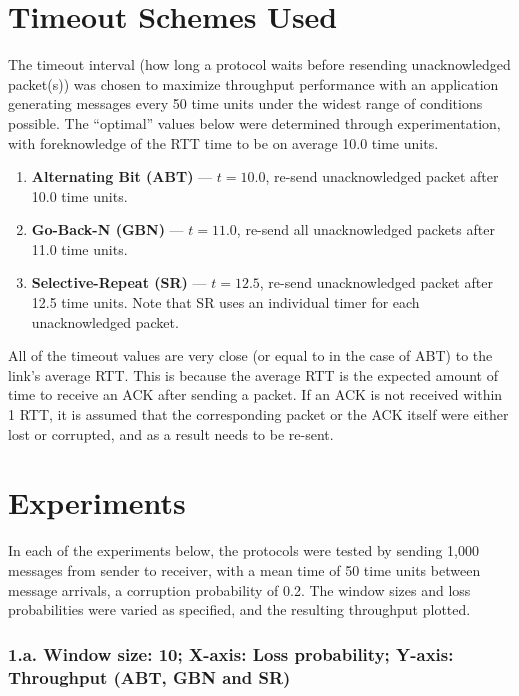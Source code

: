 \documentclass{article}
\begin{document}
\pagebreak

\section{Timeout Schemes Used}
The timeout interval (how long a protocol waits before resending unacknowledged packet(s)) was chosen to maximize throughput performance with an application generating messages every 50 time units under the widest range of conditions possible. The ``optimal'' values below were determined through experimentation, with foreknowledge of the RTT time to be on average 10.0 time units. 

\begin{enumerate}
    \item \textbf{Alternating Bit (ABT)} --- $t=10.0$, re-send unacknowledged packet after 10.0 time units.
    \item \textbf{Go-Back-N (GBN)} --- $t=11.0$, re-send all unacknowledged packets after 11.0 time units.
    \item \textbf{Selective-Repeat (SR)} --- $t=12.5$, re-send unacknowledged packet after 12.5 time units. Note that SR uses an individual timer for each unacknowledged packet.
\end{enumerate}

All of the timeout values are very close (or equal to in the case of ABT) to the link's average RTT. This is because the average RTT is the expected amount of time to receive an ACK after sending a packet. If an ACK is not received within 1 RTT, it is assumed that the corresponding packet or the ACK itself were either lost or corrupted, and as a result needs to be re-sent.

\pagebreak

\section{Experiments}

In each of the experiments below, the protocols were tested by sending 1,000 messages from sender to receiver, with a mean time of 50 time units between message arrivals, a corruption probability of 0.2. The window sizes and loss probabilities were varied as specified, and the resulting throughput plotted.

\subsubsection{1.a. Window size: 10; X-axis: Loss probability; Y-axis: Throughput (ABT, GBN and SR)}
\end{document}

